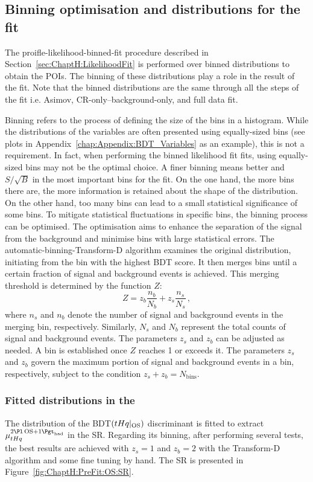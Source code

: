 \subsection{Binning optimisation and distributions for the fit}
\label{sec:ChaptH:Fit:binning}
The proifle-likelihood-binned-fit procedure described in Section~\ref{sec:ChaptH:LikelihoodFit} is performed over 
binned distributions to obtain the POIs. The binning of these distributions play a role in the result 
of the fit. Note that the binned distributions are the same through all the steps of the fit i.e. Asimov, 
CR-only--background-only, and full data fit.

Binning refers to the process of defining the size of the bins in a histogram. 
While the distributions of the variables are often presented using equally-sized bins 
(see plots in Appendix~\ref{chap:Appendix:BDT_Variables} as an example), this is not a requirement. 
In fact, when performing the binned likelihood fit fits, using equally-sized bins may not be the optimal choice. 
A finer binning means better \StoB and $S/\sqrt{B}$ in the most important bins for the fit.
On the one hand, the more bins there are, the more information is retained about the shape of the distribution.
On the other hand, too many bins can lead to a small statistical significance of some bins.
To mitigate statistical fluctuations in specific bins, the binning process can be optimised. 
The optimisation aims to enhance the separation of the \tHq signal from the background 
and minimise bins with large statistical errors. The automatic-binning-Transform-D algorithm examines the 
original distribution, initiating from the bin with the highest BDT score. 
It then merges bins until a certain fraction of signal and background events is achieved. 
This merging threshold is determined by the function $Z$:
\begin{equation*}
	Z = z_{b}\frac{n_b}{N_b} + z_{s}\frac{n_s}{N_s}\, ,
\end{equation*}
where \( n_s \) and \( n_b \) denote the number of signal and background events 
in the merging bin, respectively. Similarly, \( N_s \) and \( N_b \) represent the total 
counts of signal and background events. The parameters \( z_s \) and \( z_b \) 
can be adjusted as needed. A bin is established once \( Z \) reaches 1 or exceeds 
it. The parameters \( z_s \) and \( z_b \) govern the maximum portion of signal and 
background events in a bin, respectively, subject to the condition 
\( z_s + z_b = N_{\text{bins}} \).

\subsubsection{Fitted distributions in the \dilepOStau}
\label{sec:ChaptH:Fit:Distributions:OS}
The distribution of the BDT$(tHq|_{\text{OS}})$ discriminant is fitted to extract $\mu_{\tHq}^{\dilepOStau}$ in the SR.
Regarding its binning, after performing several tests, the best results are achieved with $z_{s} = 1$ and $z_{b} = 2$
with the Transform-D algorithm and some fine tuning by hand. The SR is presented in Figure~\ref{fig:ChaptH:PreFit:OS:SR}.

